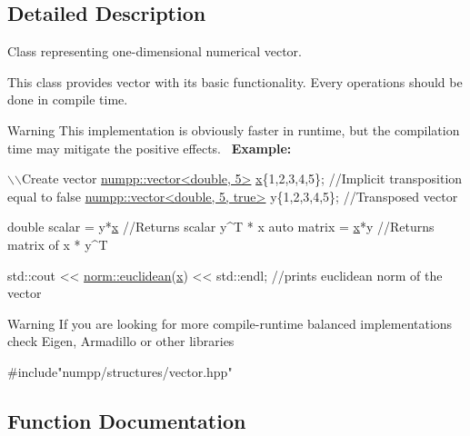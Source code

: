 \subsection{Detailed Description}
Class representing one-\/dimensional numerical vector. 

This class provides vector with it\textquotesingle{}s basic functionality. Every operations should be done in compile time.

{\bfseries \begin{DoxyWarning}{Warning}
This implementation is obviously faster in runtime, but the compilation time may mitigate the positive effects.~\newline
 {\bfseries Example\+:} 
\begin{DoxyCode}
\(\backslash\)\(\backslash\)Create vector
\hyperlink{classnumpp_1_1vector}{numpp::vector<double, 5>} \hyperlink{group__numpp__differentiation__symbolic_gac865497d2896f51d0cab2e9c64799a15}{x}\{1,2,3,4,5\}; \textcolor{comment}{//Implicit transposition equal to false}
\hyperlink{classnumpp_1_1vector}{numpp::vector<double, 5, true>} y\{1,2,3,4,5\}; \textcolor{comment}{//Transposed vector}

\textcolor{keywordtype}{double} scalar = y*\hyperlink{group__numpp__differentiation__symbolic_gac865497d2896f51d0cab2e9c64799a15}{x} \textcolor{comment}{//Returns scalar y^T * x}
\textcolor{keyword}{auto} matrix = \hyperlink{group__numpp__differentiation__symbolic_gac865497d2896f51d0cab2e9c64799a15}{x}*y \textcolor{comment}{//Returns matrix of x * y^T}

std::cout << \hyperlink{group__numpp__structures__vector_ga0a9e277caa2ef944ec7f28a794523a19}{norm::euclidean}(\hyperlink{group__numpp__differentiation__symbolic_gac865497d2896f51d0cab2e9c64799a15}{x}) << std::endl; \textcolor{comment}{//prints euclidean norm of the vector}
\end{DoxyCode}

\end{DoxyWarning}
{\bfseries \begin{DoxyWarning}{Warning}
If you are looking for more compile-\/runtime balanced implementations check Eigen, Armadillo or other libraries
\end{DoxyWarning}

\begin{DoxyCode}
\textcolor{preprocessor}{#include"numpp/structures/vector.hpp"}
\end{DoxyCode}
 }}

\subsection{Function Documentation}
\mbox{\label{group__numpp__structures__vector_ga0a9e277caa2ef944ec7f28a794523a19}} 

